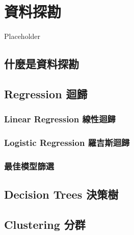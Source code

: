 \documentclass[
]{book}
\begin{document}
\hypertarget{datamining}{%
\chapter{資料探勘}\label{datamining}}

Placeholder

\hypertarget{ux4ec0ux9ebcux662fux8cc7ux6599ux63a2ux52d8}{%
\section{什麼是資料探勘}\label{ux4ec0ux9ebcux662fux8cc7ux6599ux63a2ux52d8}}

\hypertarget{regression-ux8ff4ux6b78}{%
\section{Regression 迴歸}\label{regression-ux8ff4ux6b78}}

\hypertarget{linear-regression-ux7ddaux6027ux8ff4ux6b78}{%
\subsection{Linear Regression 線性迴歸}\label{linear-regression-ux7ddaux6027ux8ff4ux6b78}}

\hypertarget{logistic-regression-ux7f85ux5409ux65afux8ff4ux6b78}{%
\subsection{Logistic Regression 羅吉斯迴歸}\label{logistic-regression-ux7f85ux5409ux65afux8ff4ux6b78}}

\hypertarget{ux6700ux4f73ux6a21ux578bux7be9ux9078}{%
\subsection{最佳模型篩選}\label{ux6700ux4f73ux6a21ux578bux7be9ux9078}}

\hypertarget{decision-trees-ux6c7aux7b56ux6a39}{%
\section{Decision Trees 決策樹}\label{decision-trees-ux6c7aux7b56ux6a39}}

\hypertarget{clustering-ux5206ux7fa4}{%
\section{Clustering 分群}\label{clustering-ux5206ux7fa4}}
\end{document}
